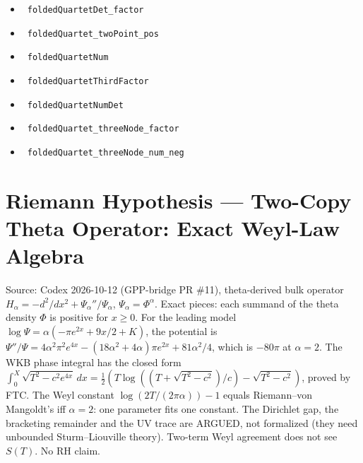 \documentclass{report}
\theoremstyle{definition}
\begin{document}
\begin{itemize}
  \item {}\leanok\ \texttt{foldedQuartetDet\_factor}
  \item {}\leanok\ \texttt{foldedQuartet\_twoPoint\_pos}
  \item {}\leanok\ \texttt{foldedQuartetNum}
  \item {}\leanok\ \texttt{foldedQuartetThirdFactor}
  \item {}\leanok\ \texttt{foldedQuartetNumDet}
  \item {}\leanok\ \texttt{foldedQuartet\_threeNode\_factor}
  \item {}\leanok\ \texttt{foldedQuartet\_threeNode\_num\_neg}
\end{itemize}

\section{Riemann Hypothesis --- Two-Copy Theta Operator: Exact Weyl-Law Algebra}
Source: Codex 2026-10-12 (GPP-bridge PR \#11), theta-derived bulk operator $H_\alpha=-d^2/dx^2+\Psi_\alpha''/\Psi_\alpha$, $\Psi_\alpha=\Phi^\alpha$. Exact pieces: each summand of the theta density $\Phi$ is positive for $x\ge0$. For the leading model $\log\Psi=\alpha(-\pi e^{2x}+9x/2+K)$, the potential is $\Psi''/\Psi=4\alpha^2\pi^2e^{4x}-(18\alpha^2+4\alpha)\pi e^{2x}+81\alpha^2/4$, which is $-80\pi$ at $\alpha=2$. The WKB phase integral has the closed form $\int_0^X\sqrt{T^2-c^2e^{4x}}\,dx=\tfrac12(T\log((T+\sqrt{T^2-c^2})/c)-\sqrt{T^2-c^2})$, proved by FTC. The Weyl constant $\log(2T/(2\pi\alpha))-1$ equals Riemann--von Mangoldt's iff $\alpha=2$: one parameter fits one constant. The Dirichlet gap, the bracketing remainder and the UV trace are ARGUED, not formalized (they need unbounded Sturm--Liouville theory). Two-term Weyl agreement does not see $S(T)$. No RH claim.
\end{document}
